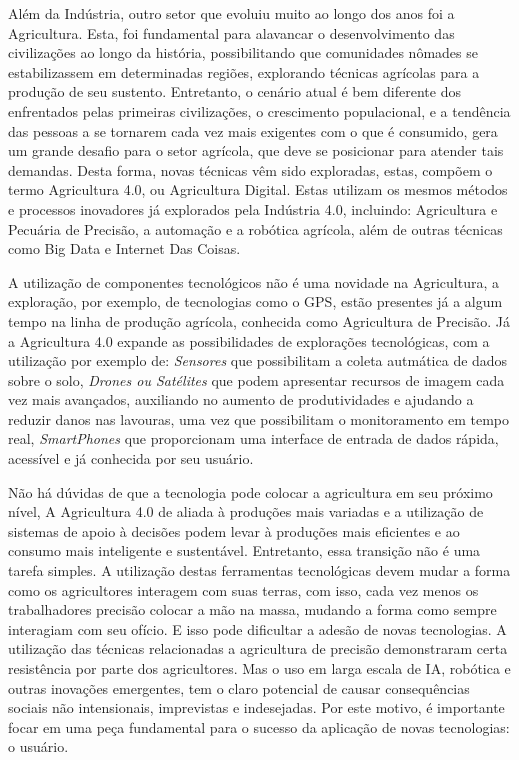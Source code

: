 \documentclass[12pt]{article}
\begin{document}
Além da Indústria, outro setor que evoluiu muito ao longo dos anos foi a Agricultura. Esta, foi fundamental para alavancar o desenvolvimento das civilizações ao longo da história, possibilitando que comunidades nômades se estabilizassem em determinadas regiões, explorando técnicas agrícolas para a produção de seu sustento. Entretanto, o cenário atual é bem diferente dos enfrentados pelas primeiras civilizações, o crescimento populacional, e a tendência das pessoas a se tornarem cada vez mais exigentes com o que é consumido, gera um grande desafio para o setor agrícola, que deve se posicionar para atender tais demandas. Desta forma, novas técnicas vêm sido exploradas, estas, compõem o termo Agricultura 4.0, ou Agricultura Digital. Estas utilizam os mesmos métodos e processos inovadores já explorados pela Indústria 4.0, incluindo: Agricultura e Pecuária de Precisão, a automação e a robótica agrícola, além de outras técnicas como Big Data e Internet Das Coisas.

A utilização de componentes tecnológicos não é uma novidade na Agricultura, a exploração, por exemplo, de tecnologias como o GPS, estão presentes já a algum tempo na linha de produção agrícola, conhecida como Agricultura de Precisão. Já a Agricultura 4.0 expande as possibilidades de explorações tecnológicas, com a utilização por exemplo de: \textit{Sensores} que possibilitam a coleta autmática de dados sobre o solo, \textit{Drones ou Satélites} que podem apresentar recursos de imagem cada vez mais avançados, auxiliando no aumento de produtividades e ajudando a reduzir danos nas lavouras, uma vez que possibilitam o monitoramento em tempo real, \textit{SmartPhones} que proporcionam uma interface de entrada de dados rápida, acessível e já conhecida por seu usuário.

Não há dúvidas de que a tecnologia pode colocar a agricultura em seu próximo nível, A Agricultura 4.0 de aliada à produções mais variadas e a utilização de sistemas de apoio à decisões podem levar à produções mais eficientes e ao consumo mais inteligente e sustentável. Entretanto, essa transição não é uma tarefa simples. A utilização destas ferramentas tecnológicas devem mudar a forma como os agricultores interagem com suas terras, com isso, cada vez menos os trabalhadores precisão colocar a mão na massa, mudando a forma como sempre interagiam com seu ofício. E isso pode dificultar a adesão de novas tecnologias. A utilização das técnicas relacionadas a agricultura de precisão demonstraram certa resistência por parte dos agricultores. Mas o uso em larga escala de IA, robótica e outras inovações emergentes, tem o claro potencial de causar consequências sociais não intensionais, imprevistas e indesejadas. Por este motivo, é importante focar em uma peça fundamental para o sucesso da aplicação de novas tecnologias: o usuário.
\end{document}
